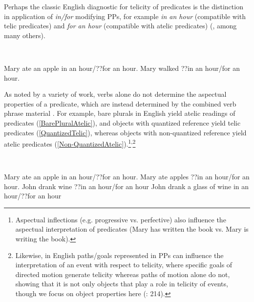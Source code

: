\documentclass[output=paper
,modfonts
,nonflat
]{langsci/langscibook}
\begin{document}
Perhaps the classic English diagnostic for telicity of predicates is the distinction in application of \textit{in/for} modifying PPs, for example \textit{in an hour} (compatible with telic predicates) and \textit{for an hour} (compatible with atelic predicates) (\citealt{Vendler:1967,Dowty:1979,Thompson:2006,Beavers:2012}, among many others). 

\ea
{} \\
\begin{xlist}
\ex Mary ate an apple in an hour/??for an hour.   
\ex Mary walked ??in an hour/for an hour.
\end{xlist}
\z
\noindent As noted by a variety of work, verbs alone do not determine the aspectual properties of a predicate, which are instead determined by the combined verb phrase material \citep{Verkuyl:1972,Verkuyl:1989,Verkuyl:1993,Verkuyl:1999,Pustejovsky:1991,Zagona:1993,Garey:1957,Tenny:1987,Tenny:1992,Tenny:1994,Krifka:1989,Krifka:1998a,Krifka:1992,Dowty:1991,Jackendoff:1991,Jackendoff:1996,Travis:2010}. For example, bare plurals in English yield atelic readings of predicates (\ref{BarePluralAtelic}), and objects with quantized reference yield telic predicates (\ref{QuantizedTelic}), whereas objects with non-quantized reference yield atelic predicates (\ref{Non-QuantizedAtelic}).\footnote{Aspectual inflections (e.g. progressive vs. perfective) also influence the aspectual interpretation of predicates (Mary has written the book vs. Mary is writing the book).}\textsuperscript{,}\footnote{Likewise, in English paths/goals represented in PPs can influence the interpretation of an event with respect to telicity, where specific goals of directed motion generate telicity whereas paths of motion alone do not, showing that it is not only objects that play a role in telicity of events, though we focus on object properties here (\citealt{Thompson:2006}: 214).} 

\ea \label{TelicityVerbPlusObject}
 \\

\begin{xlist}
\ex Mary ate an apple in an hour/??for an hour. \label{TelicIndefinite}  
\ex Mary ate apples ??in an hour/for an hour. \label{BarePluralAtelic}
\ex John drank wine ??in an hour/for an hour \label{Non-QuantizedAtelic}
\ex John drank a glass of wine in an hour/??for an hour	\label{QuantizedTelic}
\end{xlist}
\end{document}
